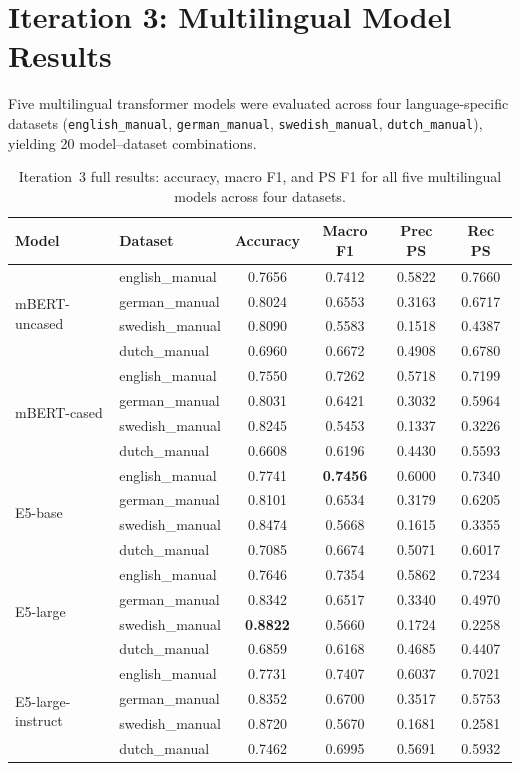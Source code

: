 \documentclass[11pt, titlepage, bibliography=totoc]{scrreprt}
\begin{document}
\section{Iteration 3: Multilingual Model Results}

Five multilingual transformer models were evaluated across four language-specific datasets (\texttt{english\_manual}, \texttt{german\_manual}, \texttt{swedish\_manual}, \texttt{dutch\_manual}), yielding 20 model--dataset combinations.

\begin{table}[htbp]
\centering
\caption{Iteration~3 full results: accuracy, macro F1, and PS F1 for all five multilingual models across four datasets.}
\label{tab:results-iter3}
\small
\begin{tabular}{@{}llcccc@{}}
\toprule
\textbf{Model} & \textbf{Dataset} & \textbf{Accuracy} & \textbf{Macro F1} & \textbf{Prec PS} & \textbf{Rec PS} \\
\midrule
\multirow{4}{*}{mBERT-uncased}
 & english\_manual  & 0.7656 & 0.7412 & 0.5822 & 0.7660 \\
 & german\_manual   & 0.8024 & 0.6553 & 0.3163 & 0.6717 \\
 & swedish\_manual  & 0.8090 & 0.5583 & 0.1518 & 0.4387 \\
 & dutch\_manual    & 0.6960 & 0.6672 & 0.4908 & 0.6780 \\
\midrule
\multirow{4}{*}{mBERT-cased}
 & english\_manual  & 0.7550 & 0.7262 & 0.5718 & 0.7199 \\
 & german\_manual   & 0.8031 & 0.6421 & 0.3032 & 0.5964 \\
 & swedish\_manual  & 0.8245 & 0.5453 & 0.1337 & 0.3226 \\
 & dutch\_manual    & 0.6608 & 0.6196 & 0.4430 & 0.5593 \\
\midrule
\multirow{4}{*}{E5-base}
 & english\_manual  & 0.7741 & \textbf{0.7456} & 0.6000 & 0.7340 \\
 & german\_manual   & 0.8101 & 0.6534 & 0.3179 & 0.6205 \\
 & swedish\_manual  & 0.8474 & 0.5668 & 0.1615 & 0.3355 \\
 & dutch\_manual    & 0.7085 & 0.6674 & 0.5071 & 0.6017 \\
\midrule
\multirow{4}{*}{E5-large}
 & english\_manual  & 0.7646 & 0.7354 & 0.5862 & 0.7234 \\
 & german\_manual   & 0.8342 & 0.6517 & 0.3340 & 0.4970 \\
 & swedish\_manual  & \textbf{0.8822} & 0.5660 & 0.1724 & 0.2258 \\
 & dutch\_manual    & 0.6859 & 0.6168 & 0.4685 & 0.4407 \\
\midrule
\multirow{4}{*}{E5-large-instruct}
 & english\_manual  & 0.7731 & 0.7407 & 0.6037 & 0.7021 \\
 & german\_manual   & 0.8352 & 0.6700 & 0.3517 & 0.5753 \\
 & swedish\_manual  & 0.8720 & 0.5670 & 0.1681 & 0.2581 \\
 & dutch\_manual    & 0.7462 & 0.6995 & 0.5691 & 0.5932 \\
\bottomrule
\end{tabular}
\end{table}
\end{document}
